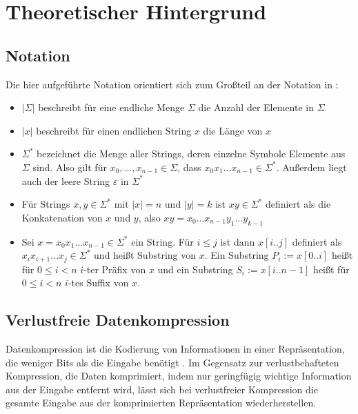
\chapter{Theoretischer Hintergrund}
\label{chapter:theorie}

\section{Notation}

Die hier aufgeführte Notation orientiert sich zum Großteil an der Notation in \cite{kieffer_grammar-based_2000}:
\begin{itemize}
    \item $|\Sigma|$ beschreibt für eine endliche Menge $\Sigma$ die Anzahl der Elemente in $\Sigma$
    \item $|x|$ beschreibt für einen endlichen String $x$ die Länge von $x$
    \item $\Sigma^*$ bezeichnet die Menge aller Strings, deren einzelne Symbole Elemente aus $\Sigma$ sind. Also gilt für $x_0, \dots, x_{n-1} \in \Sigma$, dass $x_0 x_1 \dots x_{n-1} \in \Sigma^*$. Außerdem liegt auch der leere String $\varepsilon$ in $\Sigma^*$
    \item Für Strings $x, y \in \Sigma^*$ mit $|x| = n$ und $|y| = k$ ist $xy \in \Sigma^*$ definiert als die Konkatenation von $x$ und $y$, also $xy = x_0 \dots x_{n-1} y_1 \dots y_{k-1}$ 
    \item Sei $x = x_0 x_1 \dots x_{n-1} \in \Sigma^*$ ein String. Für $i \leq j$ ist dann $x[i..j]$ definiert als $x_i x_{i+1} \dots x_j \in \Sigma^*$ und heißt Substring von $x$. Ein Substring $P_i := x[0..i]$ heißt für $0 \leq i < n$ $i$-ter Präfix von $x$ und ein Substring $S_i := x[i..n - 1]$ heißt für $0 \leq i < n$ $i$-tes Suffix von $x$.
\end{itemize}

\section{Verlustfreie Datenkompression}

Datenkompression ist die Kodierung von Informationen in einer Repräsentation, die weniger Bits als die Eingabe benötigt \cite{mahdi_implementing_2012}. 
Im Gegensatz zur verlustbehafteten Kompression, die Daten komprimiert, indem nur geringfügig wichtige Information aus der Eingabe entfernt wird, lässt sich bei verlustfreier Kompression die gesamte Eingabe aus der komprimierten Repräsentation wiederherstellen. 

